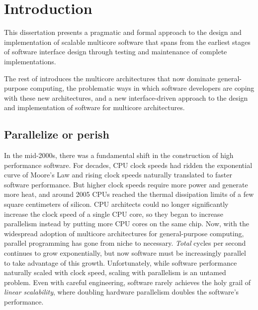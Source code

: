 \section{Introduction}
\label{sec:intro}


This dissertation presents a pragmatic and formal approach to the
design and implementation of scalable multicore software that spans
from the earliest stages of software interface design through
testing and maintenance of complete implementations.

The rest of  introduces the multicore
architectures that now dominate general-purpose computing, the
problematic ways in which software developers are coping with these
new architectures, and a new interface-driven approach to the design and
implementation of software for multicore architectures.


\subsection{Parallelize or perish}

In the mid-2000s, there was a fundamental shift in the construction of
high performance software.  For decades, CPU clock speeds had ridden
the exponential curve of Moore's Law and rising clock speeds naturally
translated to faster software performance.
%
But higher clock speeds require more power and generate more heat, and
around 2005 CPUs reached the thermal dissipation
limits of a few square centimeters of silicon.
%
CPU architects could no longer significantly increase the clock speed
of a single CPU core, so
they began to increase parallelism instead by putting more CPU cores on the same
chip.
%
Now, with the widespread adoption of multicore architectures for
general-purpose computing, parallel programming has gone from niche to
necessary.
%
\emph{Total} cycles per second continues to grow exponentially, but
now software must be increasingly parallel to take advantage of this
growth.
%
Unfortunately, while software performance naturally scaled with clock speed,
scaling with parallelism is an untamed problem.  Even with careful
engineering, software rarely achieves the holy grail of \emph{linear
  scalability}, where doubling hardware parallelism doubles the
software's performance.
%

